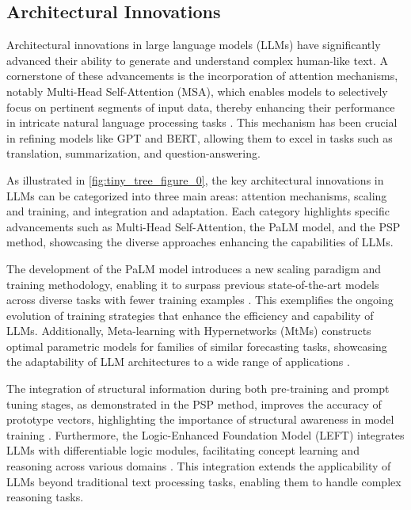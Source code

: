 







\subsection{Architectural Innovations} \label{subsec:Architectural Innovations}

Architectural innovations in large language models (LLMs) have significantly advanced their ability to generate and understand complex human-like text. A cornerstone of these advancements is the incorporation of attention mechanisms, notably Multi-Head Self-Attention (MSA), which enables models to selectively focus on pertinent segments of input data, thereby enhancing their performance in intricate natural language processing tasks \cite{park2022attentionmechanismsphysiologicalsignal}. This mechanism has been crucial in refining models like GPT and BERT, allowing them to excel in tasks such as translation, summarization, and question-answering.

As illustrated in \autoref{fig:tiny_tree_figure_0}, the key architectural innovations in LLMs can be categorized into three main areas: attention mechanisms, scaling and training, and integration and adaptation. Each category highlights specific advancements such as Multi-Head Self-Attention, the PaLM model, and the PSP method, showcasing the diverse approaches enhancing the capabilities of LLMs.

The development of the PaLM model introduces a new scaling paradigm and training methodology, enabling it to surpass previous state-of-the-art models across diverse tasks with fewer training examples \cite{chowdhery2023palm}. This exemplifies the ongoing evolution of training strategies that enhance the efficiency and capability of LLMs. Additionally, Meta-learning with Hypernetworks (MtMs) constructs optimal parametric models for families of similar forecasting tasks, showcasing the adaptability of LLM architectures to a wide range of applications \cite{stank2024designingtimeseriesmodelshypernetworks}.

The integration of structural information during both pre-training and prompt tuning stages, as demonstrated in the PSP method, improves the accuracy of prototype vectors, highlighting the importance of structural awareness in model training \cite{ge2024psppretrainingstructureprompt}. Furthermore, the Logic-Enhanced Foundation Model (LEFT) integrates LLMs with differentiable logic modules, facilitating concept learning and reasoning across various domains \cite{hsu2023whatsleftconceptgrounding}. This integration extends the applicability of LLMs beyond traditional text processing tasks, enabling them to handle complex reasoning tasks.

